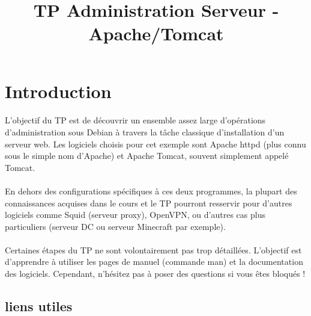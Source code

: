 \documentclass[12pt,a4paper]{article}
\title{TP Administration Serveur - Apache/Tomcat}
\begin{document}
\maketitle{}

\section{Introduction}
\paragraph{}
L'objectif du TP est de découvrir un ensemble assez large d'opérations d'administration sous Debian à travers la tâche classique d'installation d'un serveur web. Les logiciels choisis pour cet exemple sont Apache httpd (plus connu sous le simple nom d'Apache) et Apache Tomcat, souvent simplement appelé Tomcat.

\paragraph{}
En dehors des configurations spécifiques à ces deux programmes, la plupart des connaissances acquises dans le cours et le TP pourront resservir pour d'autres logiciels comme Squid (serveur proxy), OpenVPN, ou d'autres cas plus particuliers (serveur DC ou serveur Minecraft par exemple).

\paragraph{}
Certaines étapes du TP ne sont volontairement pas trop détaillées. L'objectif est d'apprendre à utiliser les pages de manuel (commande man) et la documentation des logiciels. Cependant, n'hésitez pas à poser des questions si vous êtes bloqués !

\subsection*{liens utiles}
    
\end{document}
